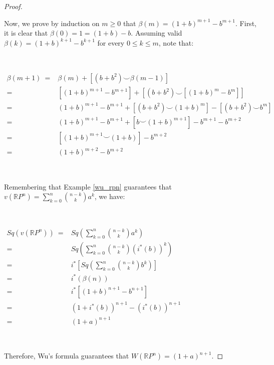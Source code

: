 \documentclass[12pt,oneside]{book}
\newcommand{\RP}{\mathbb{R}P}
\newcommand{\ccup}{\smile}
\begin{document}
\begin{proof}
        \

        Now, we prove by induction on $m\geq 0$ that $\beta(m)=(1+b)^{m+1}-b^{m+1}$. First, it is clear that $\beta(0)=1=(1+b)-b$. Assuming 
        valid $\beta(k)=(1+b)^{k+1}-b^{k+1}$ for every $0\leq k\leq m$, note that:

        \

        $ \begin{array}{rl}
        	\beta(m+1) \ = & \beta(m)+\left[ (b+b^{2})\ccup\beta(m-1) \right] \\
        	= & \left[ (1+b)^{m+1}-b^{m+1} \right]+\left[ (b+b^{2})\ccup \left[ (1+b)^{m}-b^{m} \right] \right] \\
        	= & (1+b)^{m+1}-b^{m+1}+\left[ (b+b^{2})\ccup (1+b)^{m} \right]-\left[ (b+b^{2})\ccup b^{m} \right] \\
        	= & (1+b)^{m+1}-b^{m+1}+\left[ b\ccup (1+b)^{m+1} \right]-b^{m+1}-b^{m+2} \\
        	= & \left[ (1+b)^{m+1}\ccup (1+b) \right]-b^{m+2} \\
        	= & (1+b)^{m+2}-b^{m+2}
        \end{array} $

        \

        Remembering that Example \ref{wu_rpn} guarantees that $v(\RP^{n})=\sum_{k=0}^{n}\binom{n-k}{k}a^{k}$, we have:

        \

        $ \begin{array}{rl}
        	Sq(v(\RP^{n})) \ = & Sq\left( \sum_{k=0}^{n}\binom{n-k}{k}a^{k} \right) \\
        	= & Sq\left( \sum_{k=0}^{n}\binom{n-k}{k}(i^{*}(b))^{k} \right) \\
        	= & i^{*}\left[ Sq \left( \sum_{k=0}^{n}\binom{n-k}{k}b^{k} \right) \right] \\
        	= & i^{*}(\beta(n)) \\
        	= & i^{*}\left[ (1+b)^{n+1}-b^{n+1} \right] \\
        	= & (1+i^{*}(b))^{n+1}-(i^{*}(b))^{n+1} \\
        	= & (1+a)^{n+1}
        \end{array} $

        \

        Therefore, Wu's formula guarantees that $W(\RP^{n})=(1+a)^{n+1}$.

    \end{proof}
\end{document}
